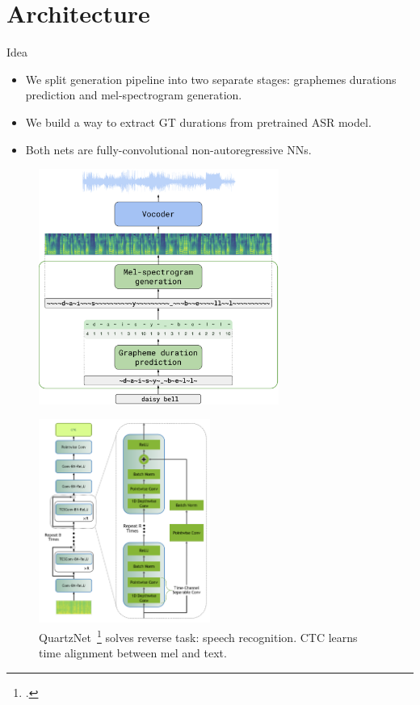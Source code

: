\section{Architecture}

\begin{frame}{Idea}
\begin{itemize}
    \item We split generation pipeline into two separate stages: graphemes durations prediction and mel-spectrogram generation.
    \item We build a way to extract GT durations from pretrained ASR model.
    \item Both nets are fully-convolutional non-autoregressive NNs.
\end{itemize}
\end{frame}

\begin{frame}
\begin{figure}[H]
\centering
\includegraphics[width=0.7\textwidth]{images/arch.png}
\end{figure}
\end{frame}

\begin{frame}
\begin{figure}[H]
\centering
\includegraphics[width=0.5\textwidth]{images/qn.png}
\caption{QuartzNet~\footcite{quartznet} solves reverse task: speech recognition. CTC learns time alignment between mel and text.}
\end{figure}
\end{frame}

